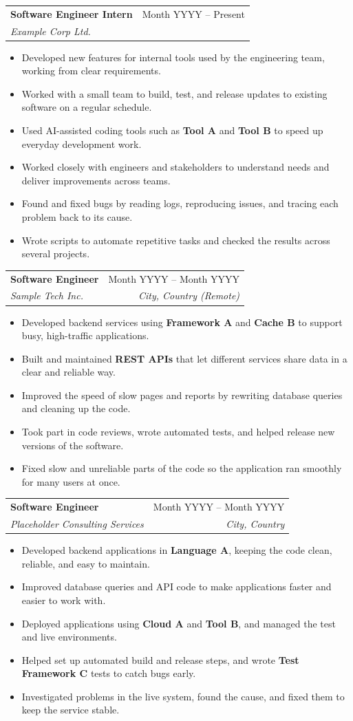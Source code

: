 \documentclass[letterpaper,11pt]{article}
\makeatletter
\newcommand{\resumeItem}[1]{
  \item\small{#1 \vspace{-2pt}}
}
\newcommand{\resumeSubheading}[4]{
  \vspace{-1pt}\item
    \begin{tabular*}{0.97\textwidth}[t]{l@{\extracolsep{\fill}}r}
      \textbf{#1} & #2 \\
      \textit{\small#3} & \textit{\small #4} \\
    \end{tabular*}\vspace{-7pt}
}
\newcommand{\resumeItemListStart}{\begin{itemize}[leftmargin=*, itemsep=-1pt]}
\newcommand{\resumeItemListEnd}{\end{itemize}\vspace{-5pt}}
\makeatother
\begin{document}
    \resumeSubheading
      {Software Engineer Intern}{Month YYYY -- Present}
      {Example Corp Ltd.}{}
      \resumeItemListStart
        \resumeItem{Developed new features for internal tools used by the engineering team, working from clear requirements.}
        \resumeItem{Worked with a small team to build, test, and release updates to existing software on a regular schedule.}
        \resumeItem{Used AI-assisted coding tools such as \textbf{Tool A} and \textbf{Tool B} to speed up everyday development work.}
        \resumeItem{Worked closely with engineers and stakeholders to understand needs and deliver improvements across teams.}
        \resumeItem{Found and fixed bugs by reading logs, reproducing issues, and tracing each problem back to its cause.}
        \resumeItem{Wrote scripts to automate repetitive tasks and checked the results across several projects.}
      \resumeItemListEnd

    \resumeSubheading
      {Software Engineer}{Month YYYY -- Month YYYY}
      {Sample Tech Inc.}{City, Country (Remote)}
      \resumeItemListStart
        \resumeItem{Developed backend services using \textbf{Framework A} and \textbf{Cache B} to support busy, high-traffic applications.}
        \resumeItem{Built and maintained \textbf{REST APIs} that let different services share data in a clear and reliable way.}
        \resumeItem{Improved the speed of slow pages and reports by rewriting database queries and cleaning up the code.}
        \resumeItem{Took part in code reviews, wrote automated tests, and helped release new versions of the software.}
        \resumeItem{Fixed slow and unreliable parts of the code so the application ran smoothly for many users at once.}
      \resumeItemListEnd

    \resumeSubheading
      {Software Engineer}{Month YYYY -- Month YYYY}
      {Placeholder Consulting Services}{City, Country}
      \resumeItemListStart
        \resumeItem{Developed backend applications in \textbf{Language A}, keeping the code clean, reliable, and easy to maintain.}
        \resumeItem{Improved database queries and API code to make applications faster and easier to work with.}
        \resumeItem{Deployed applications using \textbf{Cloud A} and \textbf{Tool B}, and managed the test and live environments.}
        \resumeItem{Helped set up automated build and release steps, and wrote \textbf{Test Framework C} tests to catch bugs early.}
        \resumeItem{Investigated problems in the live system, found the cause, and fixed them to keep the service stable.}
      \resumeItemListEnd
\end{document}

